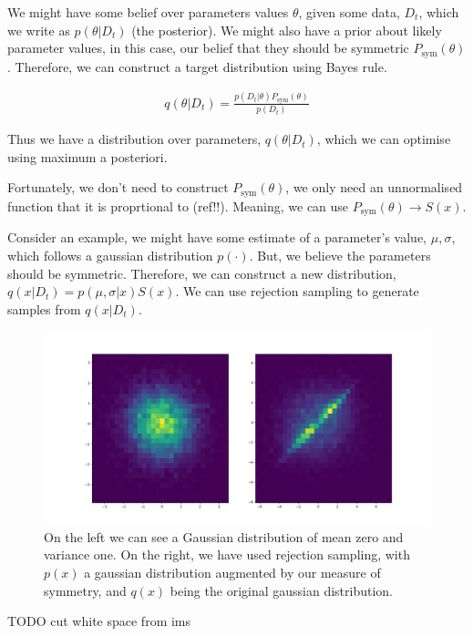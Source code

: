 We might have some belief over parameters values $\theta$, given some data, $D_t$, which we write as $p(\theta| D_t)$ (the posterior).
We might also have a prior about likely parameter values, in this case, our belief that they should be symmetric $P_{\text{sym}}(\theta)$. Therefore, we can construct a target distribution using Bayes rule.

\begin{align*}
q(\theta | D_t) = \frac{p(D_t | \theta)P_{\text{sym}}(\theta)}{p(D_t)}
\end{align*}

Thus we have a distribution over parameters, $q(\theta | D_t)$, which we can optimise using maximum a posteriori.

Fortunately, we don't need to construct $P_{\text{sym}}(\theta)$, we only need an unnormalised function that it is proprtional to ({\color{red}ref!!}). Meaning, we can use $P_{\text{sym}}(\theta)\to S(x)$.

Consider an example, we might have some estimate of a parameter's value, $\mu, \sigma$, which follows a gaussian distribution $p(\cdot)$. But, we believe the parameters should be symmetric. Therefore, we can construct a new distribution, $q(x | D_t) = p(\mu, \sigma| x)S(x)$. We can use rejection sampling to generate samples from $q(x | D_t)$.

\begin{figure}[h!]
  \centering
  \includegraphics[width=1\textwidth,height=0.25\textheight]{../../pictures/figures/symmetric-gaussian.png}
  \caption{On the left we can see a Gaussian distribution of mean zero and variance one.
  On the right, we have used rejection sampling, with $p(x)$ a gaussian
  distribution augmented by our measure of symmetry, and $q(x)$ being the original gaussian distribution.}
\end{figure}

{\color{red}TODO cut white space from ims}

